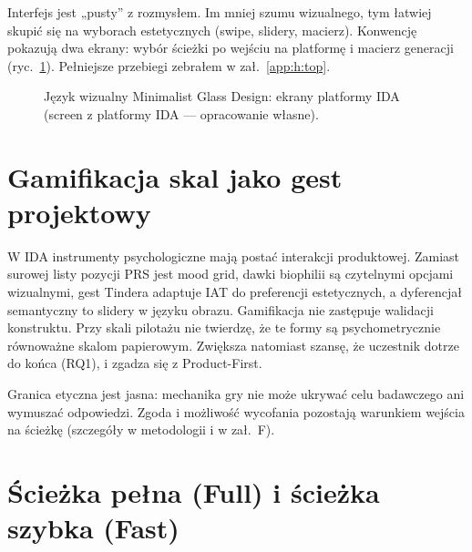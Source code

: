 Interfejs jest „pusty” z rozmysłem. Im mniej szumu wizualnego, tym łatwiej skupić się na wyborach estetycznych (swipe, slidery, macierz). Konwencję pokazują dwa ekrany: wybór ścieżki po wejściu na platformę i macierz generacji (ryc.~\ref{fig:ch07:ui-screens}). Pełniejsze przebiegi zebrałem w zał.~\ref{app:h:top}.

\begin{figure}[htbp]
  \centering
  \caption{Język wizualny Minimalist Glass Design: ekrany platformy IDA (screen z platformy IDA --- opracowanie własne).}
  \label{fig:ch07:ui-screens}
\end{figure}

\section{Gamifikacja skal jako gest projektowy}
\label{ch07:sec:gamifikacja}

W IDA instrumenty psychologiczne mają postać interakcji produktowej. Zamiast surowej listy pozycji PRS jest mood grid, dawki biophilii są czytelnymi opcjami wizualnymi, gest Tindera adaptuje IAT do preferencji estetycznych, a dyferencjał semantyczny to slidery w języku obrazu.
Gamifikacja nie zastępuje walidacji konstruktu. Przy skali pilotażu nie twierdzę, że te formy są psychometrycznie równoważne skalom papierowym. Zwiększa natomiast szansę, że uczestnik dotrze do końca (RQ1), i zgadza się z Product-First.

Granica etyczna jest jasna: mechanika gry nie może ukrywać celu badawczego ani wymuszać odpowiedzi. Zgoda i możliwość wycofania pozostają warunkiem wejścia na ścieżkę (szczegóły w metodologii i w zał.~F).

\section{Ścieżka pełna (Full) i ścieżka szybka (Fast)}
\label{ch07:sec:sciezki}

